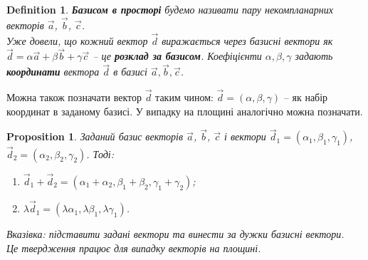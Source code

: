 \documentclass[a4paper, 10pt]{extarticle}
\theoremstyle{theoremdd}
\theoremstyle{theoremdd}
\newtheorem{definition}[theorem]{Definition}
\theoremstyle{theoremdd}
\theoremstyle{theoremdd}
\theoremstyle{theoremdd}
\newtheorem{proposition}[theorem]{Proposition}
\theoremstyle{theoremdd}
\theoremstyle{theoremdd}
\theoremstyle{theoremdd}
\begin{document}
\begin{definition}
\textbf{Базисом в просторі} будемо називати  пару некомпланарних векторів $\vec{a}$, $\vec{b}$, $\vec{c}$.\\
Уже довели, що кожний вектор $\vec{d}$ виражається через базисні вектори як $\vec{d} = \alpha \vec{a} + \beta \vec{b} + \gamma \vec{c}$ -- це \textbf{розклад за базисом}. Коефіцієнти $\alpha,\beta,\gamma$ задають \textbf{координати} вектора $\vec{d}$ в базисі $\vec{a},\vec{b},\vec{c}$.
\end{definition}
\noindent
Можна також позначати вектор $\vec{d}$ таким чином: $\vec{d} = (\alpha, \beta, \gamma)$ -- як набір координат в заданому базисі. У випадку на площині аналогічно можна позначати.

\begin{proposition} 
Заданий базис векторів $\vec{a}$, $\vec{b}$, $\vec{c}$ і вектори $\vec{d}_1 = (\alpha_1, \beta_1, \gamma_1)$, $\vec{d}_2 = (\alpha_2, \beta_2, \gamma_2)$. Тоді:
\begin{enumerate}[nosep,wide=0pt,label={\arabic*)}]
\item $\vec{d}_1 + \vec{d}_2 = (\alpha_1+\alpha_2, \beta_1+\beta_2, \gamma_1+\gamma_2)$;
\item $\lambda \vec{d}_1 = (\lambda \alpha_1, \lambda \beta_1, \lambda \gamma_1)$.
\end{enumerate}
\textit{Вказівка: підставити задані вектори та винести за дужки базисні вектори.}
\bigskip \\
Це твердження працює для випадку векторів на площині.
\end{proposition}
\end{document}
